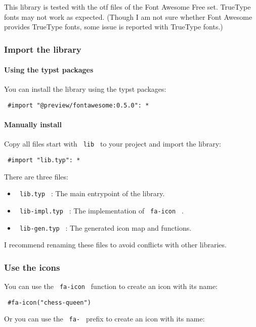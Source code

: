 This library is tested with the otf files of the Font Awesome Free set.
TrueType fonts may not work as expected. (Though I am not sure whether
Font Awesome provides TrueType fonts, some issue is reported with
TrueType fonts.)

\subsubsection{Import the library}\label{import-the-library}

\paragraph{Using the typst packages}\label{using-the-typst-packages}

You can install the library using the typst packages:

\texttt{\ \#import\ "@preview/fontawesome:0.5.0":\ *\ }

\paragraph{Manually install}\label{manually-install}

Copy all files start with \texttt{\ lib\ } to your project and import
the library:

\texttt{\ \#import\ "lib.typ":\ *\ }

There are three files:

\begin{itemize}
\tightlist
\item
  \texttt{\ lib.typ\ } : The main entrypoint of the library.
\item
  \texttt{\ lib-impl.typ\ } : The implementation of \texttt{\ fa-icon\ }
  .
\item
  \texttt{\ lib-gen.typ\ } : The generated icon map and functions.
\end{itemize}

I recommend renaming these files to avoid conflicts with other
libraries.

\subsubsection{Use the icons}\label{use-the-icons}

You can use the \texttt{\ fa-icon\ } function to create an icon with its
name:

\texttt{\ \#fa-icon("chess-queen")\ }

Or you can use the \texttt{\ fa-\ } prefix to create an icon with its
name:


